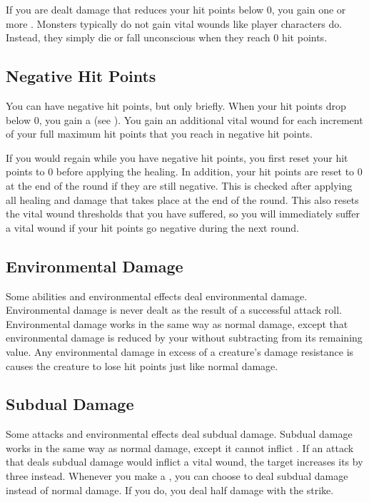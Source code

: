   If you are dealt damage that reduces your hit points below 0, you gain one or more .
  Monsters typically do not gain vital wounds like player characters do.
  Instead, they simply die or fall unconscious when they reach 0 hit points.

  \subsection{Negative Hit Points}\label{Negative Hit Points}
    You can have negative hit points, but only briefly.
    When your hit points drop below 0, you gain a  (see ).
    You gain an additional vital wound for each increment of your full maximum hit points that you reach in negative hit points.

    If you would regain  while you have negative hit points, you first reset your hit points to 0 before applying the healing.
    In addition, your hit points are reset to 0 at the end of the round if they are still negative.
    This is checked after applying all healing and damage that takes place at the end of the round.
    This also resets the vital wound thresholds that you have suffered, so you will immediately suffer a vital wound if your hit points go negative during the next round.

  \subsection{Environmental Damage}\label{Environmental Damage}
    Some abilities and environmental effects deal environmental damage.
    Environmental damage is never dealt as the result of a successful attack roll.
    Environmental damage works in the same way as normal damage, except that environmental damage is reduced by your  without subtracting from its remaining value.
    Any environmental damage in excess of a creature's damage resistance is causes the creature to lose hit points just like normal damage.

  \subsection{Subdual Damage}\label{Subdual Damage}
    Some attacks and environmental effects deal subdual damage.
    Subdual damage works in the same way as normal damage, except it cannot inflict .
    If an attack that deals subdual damage would inflict a vital wound, the target increases its  by three instead.
    Whenever you make a , you can choose to deal subdual damage instead of normal damage.
    If you do, you deal half damage with the strike.

